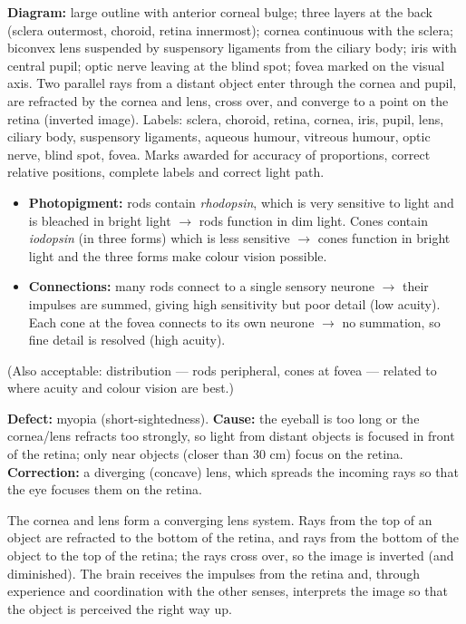 \documentclass[11pt]{article}
\begin{document}
\begin{corrige}[Exercise 1]
\textbf{Diagram:} large outline with anterior corneal bulge; three layers at the back (sclera outermost, choroid, retina innermost); cornea continuous with the sclera; biconvex lens suspended by suspensory ligaments from the ciliary body; iris with central pupil; optic nerve leaving at the blind spot; fovea marked on the visual axis. Two parallel rays from a distant object enter through the cornea and pupil, are refracted by the cornea and lens, cross over, and converge to a point on the retina (inverted image). Labels: sclera, choroid, retina, cornea, iris, pupil, lens, ciliary body, suspensory ligaments, aqueous humour, vitreous humour, optic nerve, blind spot, fovea. Marks awarded for accuracy of proportions, correct relative positions, complete labels and correct light path.
\end{corrige}

\begin{corrige}[Exercise 2]
\begin{itemize}
\item \textbf{Photopigment:} rods contain \emph{rhodopsin}, which is very sensitive to light and is bleached in bright light $\to$ rods function in dim light. Cones contain \emph{iodopsin} (in three forms) which is less sensitive $\to$ cones function in bright light and the three forms make colour vision possible.
\item \textbf{Connections:} many rods connect to a single sensory neurone $\to$ their impulses are summed, giving high sensitivity but poor detail (low acuity). Each cone at the fovea connects to its own neurone $\to$ no summation, so fine detail is resolved (high acuity).
\end{itemize}
(Also acceptable: distribution --- rods peripheral, cones at fovea --- related to where acuity and colour vision are best.)
\end{corrige}

\begin{corrige}[Exercise 3]
\textbf{Defect:} myopia (short-sightedness). \textbf{Cause:} the eyeball is too long or the cornea/lens refracts too strongly, so light from distant objects is focused in front of the retina; only near objects (closer than 30 cm) focus on the retina. \textbf{Correction:} a diverging (concave) lens, which spreads the incoming rays so that the eye focuses them on the retina.
\end{corrige}

\begin{corrige}[Exercise 4]
The cornea and lens form a converging lens system. Rays from the top of an object are refracted to the bottom of the retina, and rays from the bottom of the object to the top of the retina; the rays cross over, so the image is inverted (and diminished). The brain receives the impulses from the retina and, through experience and coordination with the other senses, interprets the image so that the object is perceived the right way up.
\end{corrige}
\end{document}

